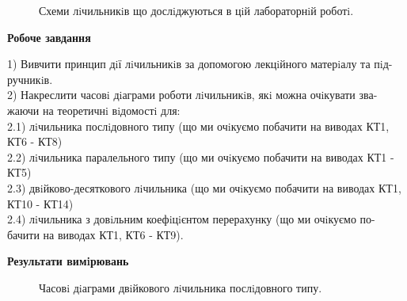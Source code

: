 \documentclass[a4paper,14pt]{extreport}
\begin{document}
\begin{figure}[h]
	\caption{Схеми лiчильникiв що дослiджуються в цiй лабораторнiй роботi.}
	\label{ris1}
\end{figure}



\begin{center}
\textbf{Робоче завдання}
\end{center}
1)  Вивчити принцип дiї лiчильникiв за допомогою лекцiйного матерiалу та пiд-
ручникiв.\\
 
2) Накреслити часовi дiаграми роботи лiчильникiв, якi можна очiкувати зва-
жаючи на теоретичнi вiдомостi для:\\
2.1) лiчильника послiдовного типу (що ми очiкуємо побачити на виводах
КТ1, КТ6 - КТ8)\\
2.2) лiчильника паралельного типу (що ми очiкуємо побачити на виводах
КТ1 - КТ5)\\
2.3) двiйково-десяткового лiчильника (що ми очiкуємо побачити на виводах
КТ1, КТ10 - КТ14)\\
2.4) лiчильника з довiльним коефiцiєнтом перерахунку (що ми очiкуємо по-
бачити на виводах КТ1, КТ6 - КТ9).

\begin{center}
\textbf{Результати вимiрювань}
\end{center}

\begin{figure}[h!]
	\caption{Часовi дiаграми двiйкового лiчильника послiдовного типу.} 
\end{figure}
 
\end{document}
